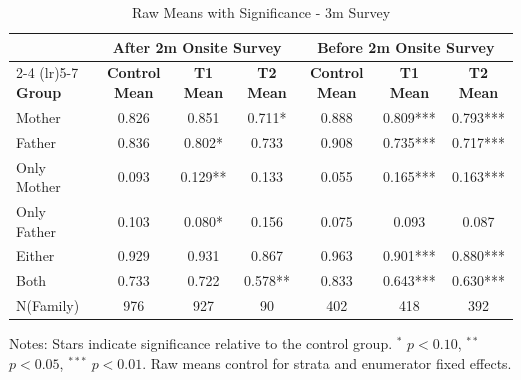 \begin{table}[htbp]
\centering
\begin{threeparttable}
\caption{Raw Means with Significance  - 3m Survey}
\begin{tabular}{lcccccc}
\toprule
& \multicolumn{3}{c}{After 2m Onsite Survey} & \multicolumn{3}{c}{Before 2m Onsite Survey} \\
\cmidrule(lr){2-4} \cmidrule(lr){5-7}
\textbf{Group} & \textbf{Control Mean} & \textbf{T1 Mean} & \textbf{T2 Mean} & \textbf{Control Mean} & \textbf{T1 Mean} & \textbf{T2 Mean} \\
\midrule
Mother &  0.826 &  0.851 &  0.711* &  0.888 &  0.809*** &  0.793*** \\
Father &  0.836 &  0.802* &  0.733 & 0.908 &  0.735*** &  0.717*** \\
Only Mother &  0.093 &  0.129** &  0.133 & 0.055 &  0.165*** &  0.163*** \\
Only Father &  0.103 &  0.080* &  0.156 &  0.075 &  0.093 &  0.087 \\
Either &  0.929 &  0.931 &  0.867 & 0.963 &  0.901*** &  0.880*** \\
Both &  0.733 &  0.722 &  0.578** &  0.833 &  0.643*** &  0.630***  \\
N(Family) & 976 & 927 & 90  & 402 & 418 & 392 \\
\bottomrule
\end{tabular}
\begin{tablenotes}
\small
Notes: Stars indicate significance relative to the control group. 
$^{*}$ $p<0.10$, $^{**}$ $p<0.05$, $^{***}$ $p<0.01$.
Raw means control for strata and enumerator fixed effects.
\end{tablenotes}
\end{threeparttable}
\end{table}


